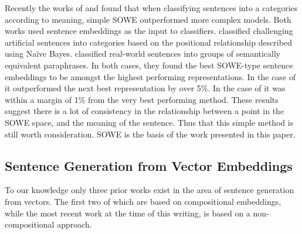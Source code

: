 \documentclass[11pt]{article}
\theoremstyle{plain}
\theoremstyle{definition}
\begin{document}
Recently the works of \textcite{RitterPosition} and \textcite{White2015SentVecMeaning} found that when classifying sentences into a categories according to meaning, simple SOWE outperformed more complex models. Both works used sentence embeddings as the input to classifiers. \textcite{RitterPosition} classified challenging artificial sentences into categories based on the positional relationship described using Naïve Bayes. \textcite{White2015SentVecMeaning} classified real-world sentences into groups of semantically equivalent paraphrases. In both cases, they found the best SOWE-type sentence embeddings to be amongst the highest performing representations. In the case of \textcite{RitterPosition} it outperformed the next best representation by over 5\%. In the case of \textcite{White2015SentVecMeaning} it was within a margin of 1\% from the very best performing method. These results suggest there is a lot of consistency in the relationship between a point in the SOWE space, and the meaning of the sentence. Thus that this simple method is still worth consideration. SOWE is the basis of the work presented in this paper.

\subsection{Sentence Generation from Vector Embeddings}

To our knowledge only three prior works exist in the area of sentence generation from vectors. The first two of which are based on compositional embeddings, while the most recent work at the time of this writing, is based on a non-compositional approach.

\newcommand{\p}{\tilde{p}_{1,2}}
\renewcommand{\u}{\tilde{u}}
\end{document}

